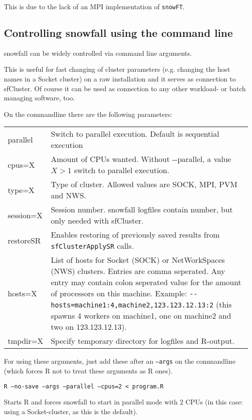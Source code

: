 \documentclass[10pt,oneside]{article}
\begin{document}
This is due to the lack of an MPI implementation of \texttt{snowFT}.

\subsection{Controlling snowfall using the command line}
snowfall can be widely controlled via command line arguments.

This is useful for fast changing of cluster parameters (e.g. changing
the host names in a Socket cluster) on a raw installation and it serves
as connection to sfCluster. Of course it can be used as connection to
any other workload- or batch managing software, too.

On the commandline there are the following parameters:

\begin{tabular}{lp{10cm}}
parallel & Switch to parallel execution. Default is sequential execution \\
cpus=X & Amount of CPUs wanted. Without {-}{-}parallel, a value $X > 1$ switch to parallel execution. \\
type=X & Type of cluster. Allowed values are SOCK, MPI, PVM and NWS. \\
session=X & Session number. snowfall logfiles contain number, but only needed with sfCluster. \\
restoreSR & Enables restoring of previously saved results from \texttt{sfClusterApplySR} calls. \\
hosts=X & List of hosts for Socket (SOCK) or NetWorkSpaces (NWS) clusters. Entries are comma seperated. Any entry may contain colon seperated value for the amount of processors on this machine. Example: \texttt{{-}{-}hosts=machine1:4,machine2,123.123.12.13:2} (this spawns 4 workers on machine1, one on machine2 and two on 123.123.12.13). \\
tmpdir=X & Specify temporary directory for logfiles and R-output. \\
\end{tabular} 

For using these arguments, just add these after an \texttt{--args} on the commandline (which
forces R not to treat these arguments as R ones).

\begin{center}
 \texttt{R --no-save --args --parallel --cpus=2 < program.R}
\end{center}

Starts R and forces snowfall to start in parallel mode with 2 CPUs (in this case: using a
Socket-cluster, as this is the default).
\end{document}
